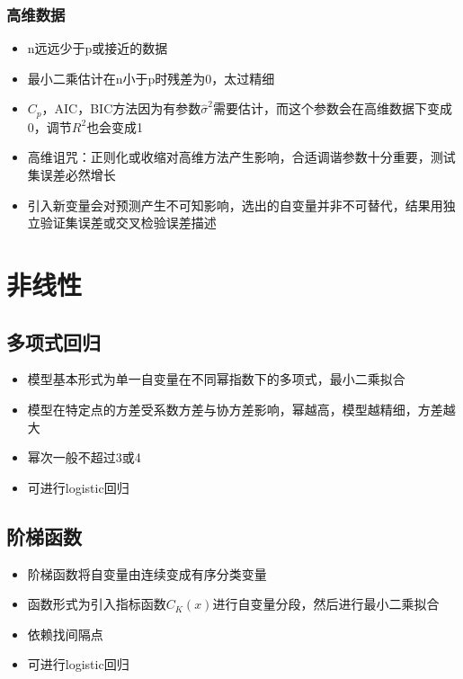\documentclass[
]{book}
\providecommand{\tightlist}{%
  \setlength{\itemsep}{0pt}\setlength{\parskip}{0pt}}
\begin{document}
\hypertarget{ux9ad8ux7ef4ux6570ux636e}{%
\subsubsection{高维数据}\label{ux9ad8ux7ef4ux6570ux636e}}

\begin{itemize}
\tightlist
\item
  n远远少于p或接近的数据
\item
  最小二乘估计在n小于p时残差为0，太过精细
\item
  \(C_p\)，AIC，BIC方法因为有参数\(\hat \sigma^2\)需要估计，而这个参数会在高维数据下变成0，调节\(R^2\)也会变成1
\item
  高维诅咒：正则化或收缩对高维方法产生影响，合适调谐参数十分重要，测试集误差必然增长
\item
  引入新变量会对预测产生不可知影响，选出的自变量并非不可替代，结果用独立验证集误差或交叉检验误差描述
\end{itemize}

\hypertarget{ux975eux7ebfux6027}{%
\section{非线性}\label{ux975eux7ebfux6027}}

\hypertarget{ux591aux9879ux5f0fux56deux5f52}{%
\subsection{多项式回归}\label{ux591aux9879ux5f0fux56deux5f52}}

\begin{itemize}
\tightlist
\item
  模型基本形式为单一自变量在不同幂指数下的多项式，最小二乘拟合
\item
  模型在特定点的方差受系数方差与协方差影响，幂越高，模型越精细，方差越大
\item
  幂次一般不超过3或4
\item
  可进行logistic回归
\end{itemize}

\hypertarget{ux9636ux68afux51fdux6570}{%
\subsection{阶梯函数}\label{ux9636ux68afux51fdux6570}}

\begin{itemize}
\tightlist
\item
  阶梯函数将自变量由连续变成有序分类变量
\item
  函数形式为引入指标函数\(C_K(x)\)进行自变量分段，然后进行最小二乘拟合
\item
  依赖找间隔点
\item
  可进行logistic回归
\end{itemize}
\end{document}
